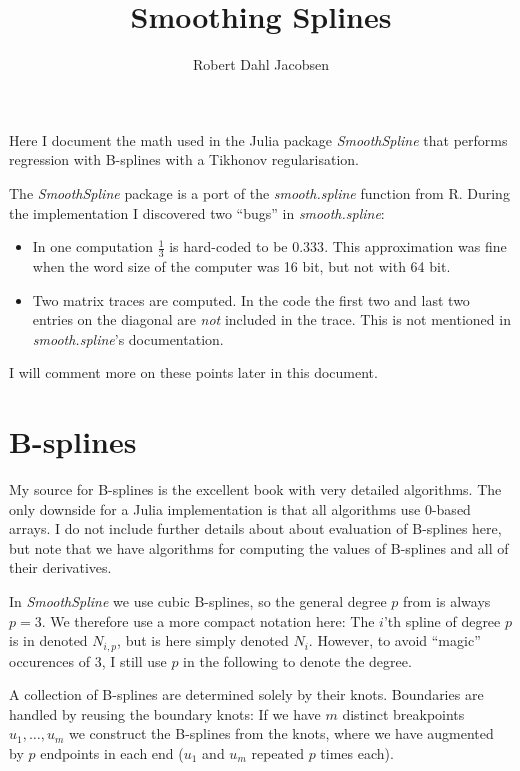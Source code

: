 \documentclass[a4paper]{scrartcl}
\title{Smoothing Splines}
\author{Robert Dahl Jacobsen}
\begin{document}
\maketitle

Here I document the math used in the Julia package \textit{SmoothSpline} that performs regression with B-splines with a Tikhonov regularisation.

The \textit{SmoothSpline} package is a port of the \textit{smooth.spline} function from R.
During the implementation I discovered two \enquote{bugs} in \textit{smooth.spline}:

\begin{itemize}
    \item In one computation $\tfrac13$ is hard-coded to be $0.333$. This approximation was fine when the word size of the computer was 16 bit, but not with 64 bit.
    \item Two matrix traces are computed. In the code the first two and last two entries on the diagonal are \emph{not} included in the trace. This is not mentioned in \textit{smooth.spline}'s documentation.
\end{itemize}

I will comment more on these points later in this document.


\section{B-splines}
\label{sec:bsplines}

My source for B-splines is the excellent book \cite{Piegl:Tiller:1997} with very detailed algorithms.
The only downside for a Julia implementation is that all algorithms use 0-based arrays.
I do not include further details about about evaluation of B-splines here, but note that we have algorithms for computing the values of B-splines and all of their derivatives.


In \textit{SmoothSpline} we use cubic B-splines, so the general degree $p$ from \cite{Piegl:Tiller:1997} is always $p = 3$.
We therefore use a more compact notation here:
The $i$'th spline of degree $p$ is in \cite{Piegl:Tiller:1997} denoted $N_{i,p}$, but is here simply denoted $N_i$.
However, to avoid \enquote{magic} occurences of 3, I still use $p$ in the following to denote the degree.

A collection of B-splines are determined solely by their knots.
Boundaries are handled by reusing the boundary knots:
If we have $m$ distinct breakpoints $u_1, \ldots, u_m$ we construct the B-splines from the knots, where we have augmented by $p$ endpoints in each end ($u_1$ and $u_m$ repeated $p$ times each).
\end{document}
